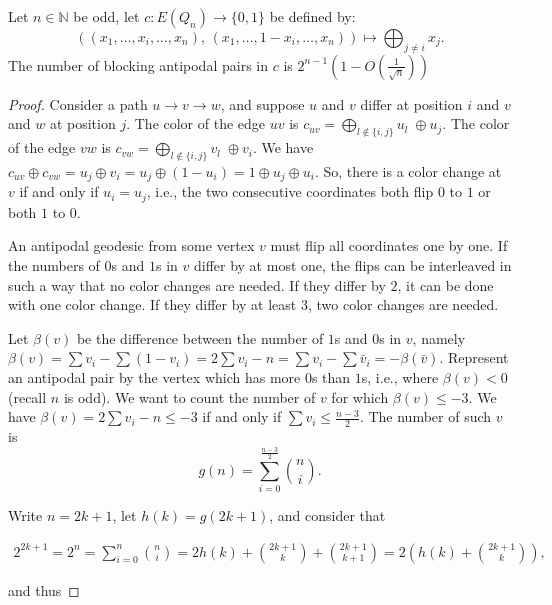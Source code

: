 \documentclass[10pt,a4paper]{amsart}
\renewcommand{\leq}{\leqslant}
\begin{document}
\begin{lemma}
    Let $n \in \mathbb{N}$ be odd, let $c : E(Q_n) \to \{0,1\}$ be defined by:
    \[
        ((x_1, \dots, x_i, \dots, x_n),\, (x_1, \dots, 1 - x_i, \dots, x_n)) \mapsto \bigoplus_{j \neq i} x_j.
    \]
    The number of blocking antipodal pairs in $c$ is $2^{n-1}\left(1-O\left(\frac{1}{\sqrt{n}}\right)\right)$
\end{lemma}

\begin{proof}
Consider a path $u\rightarrow v \rightarrow w$, and suppose $u$ and $v$ differ at position $i$ and $v$ and $w$ at position $j$.
The color of the edge $uv$ is $c_{uv} = \bigoplus_{l\not\in \{i, j\}} u_l \; \oplus u_j$.
The color of the edge $vw$ is $c_{vw} = \bigoplus_{l\not\in \{i, j\}} v_l \; \oplus v_i$.
We have $c_{uv} \oplus c_{vw} = u_j \oplus v_i = u_j \oplus (1-u_i) = 1 \oplus u_j \oplus u_i$.
So, there is a color change at $v$ if and only if $u_i = u_j$, i.e., the two consecutive coordinates both flip $0$ to $1$ or both $1$ to $0$.

An antipodal geodesic from some vertex $v$ must flip all coordinates one by one.
If the numbers of $0$s and $1$s in $v$ differ by at most one, the flips can be interleaved in such a way that no color changes are needed.
If they differ by $2$, it can be done with one color change.
If they differ by at least $3$, two color changes are needed.

Let $\beta(v)$ be the difference between the number of $1$s and $0$s in $v$, namely $\beta(v) = \sum v_i - \sum (1-v_i) = 2\sum v_i - n = \sum v_i - \sum \bar{v}_i = -\beta(\bar v)$.
Represent an antipodal pair by the vertex which has more $0$s than $1$s, i.e., where $\beta(v) < 0$ (recall $n$ is odd).
We want to count the number of $v$ for which $\beta(v) \leq -3$.
We have $\beta(v) = 2\sum v_i - n \leq -3$ if and only if $\sum v_i \leq \frac{n-3}{2}$.
The number of such $v$ is
\[ g(n) = \sum_{i = 0}^{\frac{n-3}{2}} \binom{n}{i} .\]

Write $n=2k+1$, let $h(k) = g(2k+1)$, and consider that

\begin{align*}
    2^{2k+1} = 2^n = \sum_{i=0}^{n} \binom{n}{i} = 
    2h(k) + \binom{2k+1}{k} + \binom{2k+1}{k+1} = 
    2\left(h(k) + \binom{2k+1}{k}\right),
\end{align*} 

and thus


\end{proof}
\end{document}
